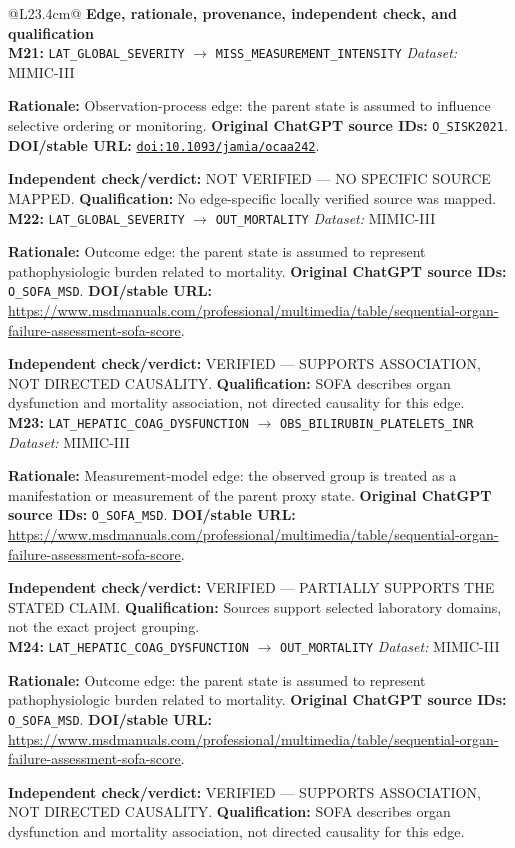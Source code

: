 \begin{tabular}{@{}L{23.4cm}@{}}
\toprule
\textbf{Edge, rationale, provenance, independent check, and qualification}\\
\midrule
\textbf{M21:} \nolinkurl{LAT_GLOBAL_SEVERITY} $\rightarrow$ \nolinkurl{MISS_MEASUREMENT_INTENSITY} \hfill \textit{Dataset:} MIMIC-III\par\textbf{Rationale:} Observation-process edge: the parent state is assumed to influence selective ordering or monitoring. \textbf{Original ChatGPT source IDs:} \nolinkurl{O_SISK2021}. \textbf{DOI/stable URL:} \href{https://doi.org/10.1093/jamia/ocaa242}{\nolinkurl{doi:10.1093/jamia/ocaa242}}.\par\textbf{Independent check/verdict:} NOT VERIFIED --- NO SPECIFIC SOURCE MAPPED. \textbf{Qualification:} No edge-specific locally verified source was mapped. \\
\addlinespace[2pt]
\midrule
\textbf{M22:} \nolinkurl{LAT_GLOBAL_SEVERITY} $\rightarrow$ \nolinkurl{OUT_MORTALITY} \hfill \textit{Dataset:} MIMIC-III\par\textbf{Rationale:} Outcome edge: the parent state is assumed to represent pathophysiologic burden related to mortality. \textbf{Original ChatGPT source IDs:} \nolinkurl{O_SOFA_MSD}. \textbf{DOI/stable URL:} \url{https://www.msdmanuals.com/professional/multimedia/table/sequential-organ-failure-assessment-sofa-score}.\par\textbf{Independent check/verdict:} VERIFIED --- SUPPORTS ASSOCIATION, NOT DIRECTED CAUSALITY. \textbf{Qualification:} SOFA describes organ dysfunction and mortality association, not directed causality for this edge. \\
\addlinespace[2pt]
\midrule
\textbf{M23:} \nolinkurl{LAT_HEPATIC_COAG_DYSFUNCTION} $\rightarrow$ \nolinkurl{OBS_BILIRUBIN_PLATELETS_INR} \hfill \textit{Dataset:} MIMIC-III\par\textbf{Rationale:} Measurement-model edge: the observed group is treated as a manifestation or measurement of the parent proxy state. \textbf{Original ChatGPT source IDs:} \nolinkurl{O_SOFA_MSD}. \textbf{DOI/stable URL:} \url{https://www.msdmanuals.com/professional/multimedia/table/sequential-organ-failure-assessment-sofa-score}.\par\textbf{Independent check/verdict:} VERIFIED --- PARTIALLY SUPPORTS THE STATED CLAIM. \textbf{Qualification:} Sources support selected laboratory domains, not the exact project grouping. \\
\addlinespace[2pt]
\midrule
\textbf{M24:} \nolinkurl{LAT_HEPATIC_COAG_DYSFUNCTION} $\rightarrow$ \nolinkurl{OUT_MORTALITY} \hfill \textit{Dataset:} MIMIC-III\par\textbf{Rationale:} Outcome edge: the parent state is assumed to represent pathophysiologic burden related to mortality. \textbf{Original ChatGPT source IDs:} \nolinkurl{O_SOFA_MSD}. \textbf{DOI/stable URL:} \url{https://www.msdmanuals.com/professional/multimedia/table/sequential-organ-failure-assessment-sofa-score}.\par\textbf{Independent check/verdict:} VERIFIED --- SUPPORTS ASSOCIATION, NOT DIRECTED CAUSALITY. \textbf{Qualification:} SOFA describes organ dysfunction and mortality association, not directed causality for this edge. \\

\end{tabular}
